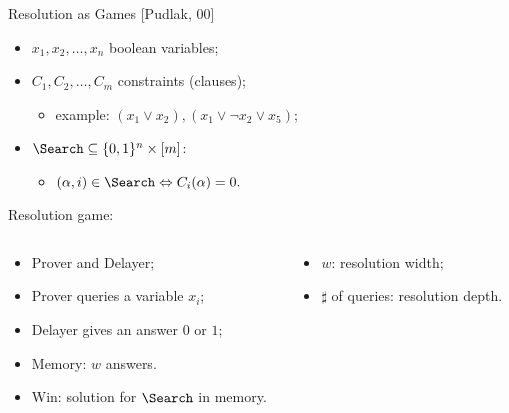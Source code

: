 \begin{frame}{Resolution as Games [Pudlak, 00]}

    \begin{itemize}
        \item $x_1, x_2, \dots, x_n$ boolean variables;
        \item $C_1, C_2, \dots, C_m$ constraints (clauses);
            \pause
            \begin{itemize}
                \item example: $(x_1 \lor x_2), (x_1 \lor \neg x_2 \lor x_5)$;
            \end{itemize}
            \pause
        \item $\Search \subseteq \{0, 1\}^n \times [m]$:
        \begin{itemize}
            \item $(\alpha, i) \in \Search \Leftrightarrow C_{i}(\alpha) = 0.$
        \end{itemize}
    \end{itemize}

    \pause
    \vspace{0.5cm}
    Resolution game:
    \begin{columns}
        \begin{column}[t]{0.48\linewidth}
            \begin{itemize}
                \item Prover and Delayer;
                    \pause
                \item Prover queries a variable $x_i$;
                \item Delayer gives an answer $0$ or $1$;
                    \pause
                \item Memory: $w$ answers.
                \item Win: solution for $\Search$ in memory.
            \end{itemize}
        \end{column}
        \begin{column}[t]{0.48\linewidth}
            \pause
            \begin{itemize}
                \item $w$: resolution width;
                    \pause
                \item $\sharp$ of queries: resolution depth.
            \end{itemize}
        \end{column}
    \end{columns}
    
\end{frame}